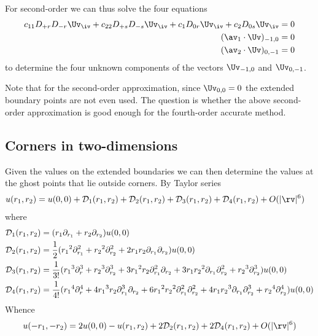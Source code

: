 \documentclass[10pt]{article}
\newcommand{\Ds}{{\mathcal D}}%
\newcommand{\ra}{{r_1}}%
\newcommand{\rb}{{r_2}}%
\begin{document}
For second-order we can thus solve the four equations 
\begin{align*}
  c_{11} D_{+r}D_{-r} \Uv_\iv + c_{22} D_{+s}D_{-s} \Uv_\iv + c_{1} D_{0r} \Uv_\iv + c_{2} D_{0s} \Uv_\iv &= 0 \\
  (\av_1\cdot\Uv)_{-1,0} &= 0 \\
  (\av_2\cdot\Uv)_{0,-1} &= 0 
\end{align*}
to determine the four unknown components of the vectors $\Uv_{-1,0}$ and $\Uv_{0,-1}$.

Note that for the second-order approximation, since $\Uv_{0,0}=0$ the extended boundary points are
not even used. The question is whether the above second-order approximation is good enough
for the fourth-order accurate method.

\clearpage
\subsection{Corners in two-dimensions}


Given the values on the extended boundaries we can then determine the 
values at the ghost points that lie outside corners.
\newcommand{\trunc}{O(|\rv|^6)}%
\newcommand{\truncb}{O(|\rv|^4)}%
\newcommand{\trunca}{O(|\rv|^2)}%
By Taylor series
\begin{align*}
  u(\ra,\rb)&= u(0,0) + \Ds_1(\ra,\rb) + \Ds_2(\ra,\rb) + \Ds_3(\ra,\rb) + \Ds_4(\ra,\rb) + \trunc
\end{align*}
where
\begin{align*}
  \Ds_1(\ra,\rb) &= (\ra \partial_\ra + \rb \partial_\rb ) u(0,0) \\
  \Ds_2(\ra,\rb) &= {1\over2}( \ra^2\partial_\ra^2+\rb^2\partial_\rb^2+ 2\ra\rb\partial_\ra\partial_\rb  )u(0,0)  \\
  \Ds_3(\ra,\rb) &= {1\over3!}( \ra^3\partial_r^3 + \rb^3\partial_\rb^3 
                   +3\ra^2\rb\partial_\ra^2\partial_\rb 
                   + 3\ra\rb^2\partial_\ra\partial_\rb^2 
                   + \rb^3\partial_\rb^3  )u(0,0)                    \\
  \Ds_4(\ra,\rb) &= {1\over4!}( \ra^4\partial_r^4
                   +4\ra^3\rb\partial_\ra^3\partial_\rb 
                   +6\ra^2\rb^2\partial_\ra^2\partial_\rb^2 
                   +4\ra\rb^3\partial_\ra\partial_\rb^3 
                   + \rb^4\partial_\rb^4   )u(0,0)  
\end{align*}
Whence
\begin{align}
 u(-\ra,-\rb) &= 2 u(0,0) - u(\ra,\rb) + 2\Ds_2(\ra,\rb) + 2\Ds_4(\ra,\rb)+ \trunc \label{taylor1} \\
\end{align}
\end{document}
